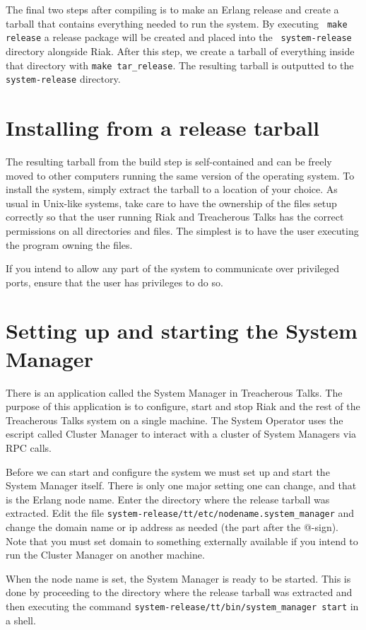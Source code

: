 \documentclass[11pt,a4paper]{report}
\begin{document}
The final two steps after compiling is to make an Erlang release and create a
tarball that contains everything needed to run the system. By executing {\tt
  make release} a release package will be created and placed into the {\tt
  system-release} directory alongside Riak. After this step, we create a tarball
of everything inside that directory with {\tt make tar\_release}. The resulting
tarball is outputted to the {\tt system-release} directory.
\section{Installing from a release tarball}
The resulting tarball from the build step is self-contained and can be freely
moved to other computers running the same version of the operating system. To
install the system, simply extract the tarball to a location of your choice. As
usual in Unix-like systems, take care to have the ownership of the files setup
correctly so that the user running Riak and Treacherous Talks has the correct
permissions on all directories and files. The simplest is to have the user
executing the program owning the files.

If you intend to allow any part of the system to communicate over privileged
ports, ensure that the user has privileges to do so.
\section{Setting up and starting the System Manager}
There is an application called the System Manager in Treacherous Talks. The
purpose of this application is to configure, start and stop Riak and the rest of
the Treacherous Talks system on a single machine. The System Operator uses the
escript called Cluster Manager to interact with a cluster of System Managers via
RPC calls.

\begin{sloppypar}
Before we can start and configure the system we must set up and start the System
Manager itself. There is only one major setting one can change, and that is the
Erlang node name. Enter the directory where the release tarball was extracted.
Edit the file {\tt system-release/tt/etc/nodename.system\_manager} and change
the domain name or ip address as needed (the part after the @-sign). Note that
you must set domain to something externally available if you intend to run the
Cluster Manager on another machine.
\end{sloppypar}

\begin{sloppypar}
When the node name is set, the System Manager is ready to be started. This is
done by proceeding to the directory where the release tarball was extracted and
then executing the command {\tt system-release/tt/bin/system\_manager start} in
a shell.
\end{sloppypar}
\end{document}
